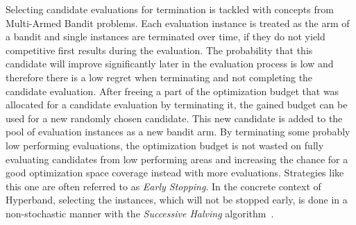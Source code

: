 Selecting candidate evaluations for termination is tackled with concepts from Multi-Armed Bandit problems.
Each evaluation instance is treated as the arm of a bandit and single instances are terminated over time, if they do not yield competitive first results during the evaluation.
The probability that this candidate will improve significantly later in the evaluation process is low and therefore there is a low regret when terminating and not completing the candidate evaluation.\newline
After freeing a part of the optimization budget that was allocated for a candidate evaluation by terminating it, the gained budget can be used for a new randomly chosen candidate.
This new candidate is added to the pool of evaluation instances as a new bandit arm.
By terminating some probably low performing evaluations, the optimization budget is not wasted on fully evaluating candidates from low performing areas and increasing the chance for a good optimization space coverage instead with more evaluations.
Strategies like this one are often referred to as \textit{Early Stopping}.
In the concrete context of Hyperband, selecting the instances, which will not be stopped early, is done in a non-stochastic manner with the \textit{Successive Halving} algorithm~\cite{Jamieson-SuccessiveHalving}.
